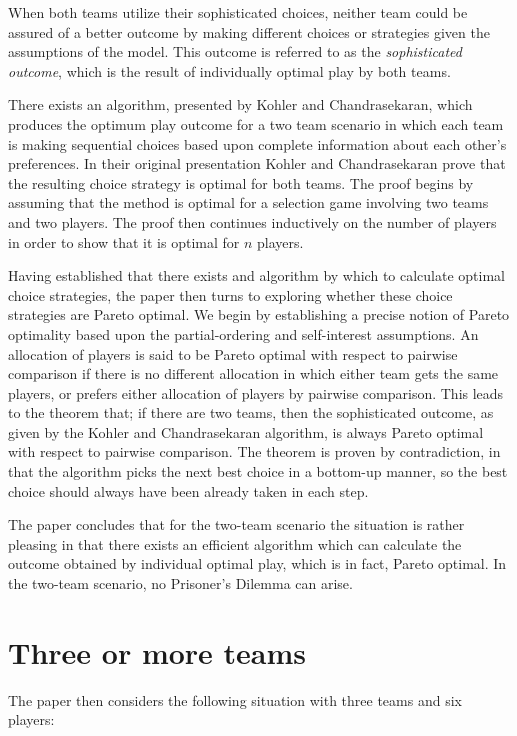 \documentclass{article}
\begin{document}
When both teams utilize their sophisticated choices, neither team could be assured of a better outcome by making different choices or strategies given the assumptions of the model. This outcome is referred to as the {\em sophisticated outcome}, which is the result of individually optimal play by both teams.

There exists an algorithm, presented by Kohler and Chandrasekaran\cite{kohler71}, which produces the optimum play outcome for a two team scenario in which each team is making sequential choices based upon complete information about each other's preferences. In their original presentation Kohler and Chandrasekaran prove that the resulting choice strategy is optimal for both teams. The proof begins by assuming that the method is optimal for a selection game involving two teams and two players. The proof then continues inductively on the number of players in order to show that it is optimal for $n$ players.

Having established that there exists and algorithm by which to calculate optimal choice strategies, the paper then turns to exploring whether these choice strategies are Pareto optimal. We begin by establishing a precise notion of Pareto optimality based upon the partial-ordering and self-interest assumptions. An allocation of players is said to be Pareto optimal with respect to pairwise comparison if there is no different allocation in which either team gets the same players, or prefers either allocation of players by pairwise comparison. This leads to the theorem that; if there are two teams, then the sophisticated outcome, as given by the Kohler and Chandrasekaran algorithm, is always Pareto optimal with respect to pairwise comparison. The theorem is proven by contradiction, in that the algorithm picks the next best choice in a bottom-up manner, so the best choice should always have been already taken in each step.

The paper concludes that for the two-team scenario the situation is rather pleasing in that there exists an efficient algorithm which can calculate the outcome obtained by individual optimal play, which is in fact, Pareto optimal. In the two-team scenario, no Prisoner's Dilemma can arise.

\section{Three or more teams}

The paper then considers the following situation with three teams and six players:
\end{document}

